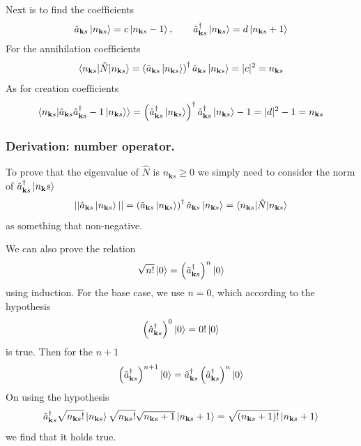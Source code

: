 \documentclass[../../../main.tex]{subfiles}
\begin{document}
Next is to find the coefﬁcients
\begin{equation*}
  \hat{a}_{\mathbf{k }s} \ket{n_{\mathbf{k }s}} = c \ket{n_{\mathbf{k }s}-1}, \qquad
  \hat{a}_{\mathbf{k }s}^\dagger \ket{n_{\mathbf{k }s}} = d \ket{n_{\mathbf{k }s}+1}
\end{equation*}
For the annihilation coefﬁcients
\begin{equation*}
  \braket{n_{\mathbf{k }s} | \hat{N }|n_{\mathbf{k }s}} =
  \left( \hat{a}_{\mathbf{k }s} \ket{n_{\mathbf{k }s}} \right) ^\dagger \hat{a}_{\mathbf{k }s} \ket{n_{\mathbf{k }s}}=|c|^2= n_{\mathbf{k }s}
\end{equation*}
As for creation coefﬁcients
\begin{equation*}
  \braket{n_{\mathbf{k }s} |\hat{a}_{\mathbf{k }s} \hat{a}^\dagger_{\mathbf{k }s} -1 \ket{n_{\mathbf{k }s}}} = \left( \hat{a}^\dagger_{\mathbf{k }s} \ket{n_{\mathbf{k }s}} \right) ^\dagger \hat{a}^\dagger_{\mathbf{k }s} \ket{n_{\mathbf{k }s}}-1=|d|^2-1=n_{\mathbf{k }s}
\end{equation*}

\subsubsection{Derivation: number operator.}
To prove that the eigenvalue of $\hat{N }$ is $n_{\mathbf{k }s}\geq0$ we simply need to consider the norm of $\hat{a}^\dagger_{\mathbf{k }s} \ket{n_{\mathbf{k }}s}$
\begin{equation*}
  ||\hat{a}_{\mathbf{k }s} \ket{n_{\mathbf{k }s}}||=\left( \hat{a}_{\mathbf{k }s} \ket{n_{\mathbf{k }s}} \right) ^\dagger \hat{a}_{\mathbf{k }s} \ket{n_{\mathbf{k }s}}=\braket{n_{\mathbf{k }s} |\hat{N}|n_{\mathbf{k }s} }
\end{equation*}
as something that non-negative.

We can also prove the relation
\begin{equation*}
  \sqrt{n! }  \ket{0 }= \left( \hat{a}^\dagger_{\mathbf{k }s}   \right) ^n \ket{0}
\end{equation*}
using induction.
For the base case, we use $n=0$, which according to the hypothesis
\begin{equation*}
  \left( \hat{a}^\dagger_{\mathbf{k }s}  \right) ^0 \ket{0 }=0! \ket{0}
\end{equation*}
is true.
Then for the $n+1$
\begin{equation*}
  \left( \hat{a}^\dagger_{\mathbf{k }s}   \right) ^{n+1 }\ket{0 }=\hat{a}^\dagger_{\mathbf{k }s}  \left( \hat{a}^\dagger_{\mathbf{k }s}   \right) ^n \ket{0 }
\end{equation*}
On using the hypothesis
\begin{equation*}
  \hat{a}^\dagger_{\mathbf{k }s} \sqrt{n_{\mathbf{k }s}! } \ket{n_{\mathbf{k }s} }\sqrt{n_{\mathbf{k }s}! }\sqrt{n_{\mathbf{k }s}+1}\ket{n_{\mathbf{k }s}+1}= \sqrt{(n_{\mathbf{k }s}+1)!} \ket{n_{\mathbf{k }s}+1}
\end{equation*}
we find that it holds true.
\end{document}
